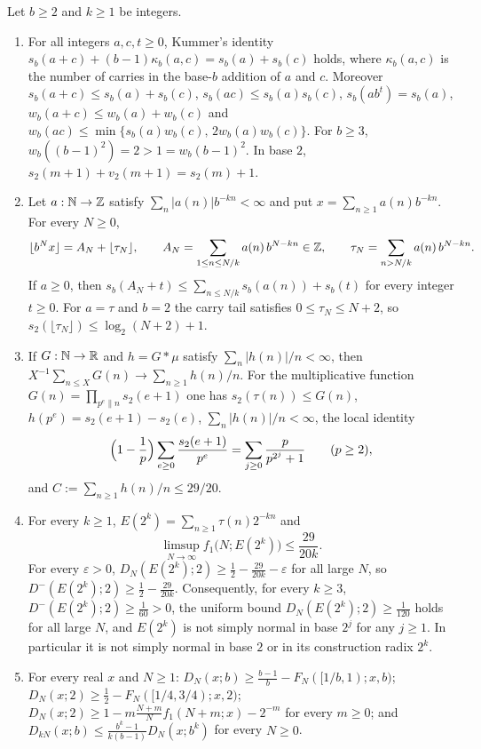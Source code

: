 \documentclass[11pt]{article}
\begin{document}
\begin{maintheorem}\label{thm:A}
Let $b\ge2$ and $k\ge1$ be integers.
\begin{enumerate}[label=\textup{(\roman*)},nosep]
\item {} For all integers $a,c,t\ge0$, Kummer's identity $s_b(a+c)+(b-1)\kappa_b(a,c)=s_b(a)+s_b(c)$ holds, where $\kappa_b(a,c)$ is the number of carries in the base-$b$ addition of $a$ and $c$. Moreover $s_b(a+c)\le s_b(a)+s_b(c)$, $s_b(ac)\le s_b(a)s_b(c)$, $s_b(ab^t)=s_b(a)$, $w_b(a+c)\le w_b(a)+w_b(c)$ and $w_b(ac)\le\min\{s_b(a)w_b(c),\,2w_b(a)w_b(c)\}$. For $b\ge3$, $w_b((b-1)^2)=2>1=w_b(b-1)^2$. In base $2$, $s_2(m+1)+v_2(m+1)=s_2(m)+1$.
\item {} Let $a:\mathbb N\to\mathbb Z$ satisfy $\sum_n|a(n)|b^{-kn}<\infty$ and put $x=\sum_{n\ge1}a(n)b^{-kn}$. For every $N\ge0$,
\[
\lfloor b^Nx\rfloor=A_N+\lfloor\tau_N\rfloor,\qquad A_N=\sum_{1\le n\le N/k}a(n)\,b^{N-kn}\in\mathbb Z,\qquad \tau_N=\sum_{n>N/k}a(n)\,b^{N-kn}.
\]
If $a\ge0$, then $s_b(A_N+t)\le\sum_{n\le N/k}s_b(a(n))+s_b(t)$ for every integer $t\ge0$. For $a=\tau$ and $b=2$ the carry tail satisfies $0\le\tau_N\le N+2$, so $s_2(\lfloor\tau_N\rfloor)\le\log_2(N+2)+1$.
\item {} If $G:\mathbb N\to\mathbb R$ and $h=G*\mu$ satisfy $\sum_n|h(n)|/n<\infty$, then $X^{-1}\sum_{n\le X}G(n)\to\sum_{n\ge1}h(n)/n$. For the multiplicative function $G(n)=\prod_{p^e\parallel n}s_2(e+1)$ one has $s_2(\tau(n))\le G(n)$, $h(p^e)=s_2(e+1)-s_2(e)$, $\sum_n|h(n)|/n<\infty$, the local identity
\[
\Bigl(1-\frac1p\Bigr)\sum_{e\ge0}\frac{s_2(e+1)}{p^e}=\sum_{j\ge0}\frac{p}{p^{2^j}+1}\qquad(p\ge2),
\]
and $C:=\sum_{n\ge1}h(n)/n\le 29/20$.
\item {} For every $k\ge1$, $E(2^k)=\sum_{n\ge1}\tau(n)2^{-kn}$ and
\[
\limsup_{N\to\infty}f_1\bigl(N;E(2^k)\bigr)\le\frac{29}{20k}.
\]
For every $\varepsilon>0$, $D_N(E(2^k);2)\ge\frac12-\frac{29}{20k}-\varepsilon$ for all large $N$, so $D^-(E(2^k);2)\ge\frac12-\frac{29}{20k}$. Consequently, for every $k\ge3$, $D^-(E(2^k);2)\ge\frac1{60}>0$, the uniform bound $D_N(E(2^k);2)\ge\frac1{120}$ holds for all large $N$, and $E(2^k)$ is not simply normal in base $2^j$ for any $j\ge1$. In particular it is not simply normal in base $2$ or in its construction radix $2^k$.
\item {} For every real $x$ and $N\ge1$: $D_N(x;b)\ge\frac{b-1}b-F_N([1/b,1);x,b)$; $D_N(x;2)\ge\frac12-F_N([1/4,3/4);x,2)$; $D_N(x;2)\ge1-m\frac{N+m}{N}f_1(N+m;x)-2^{-m}$ for every $m\ge0$; and $D_{kN}(x;b)\le\frac{b^k-1}{k(b-1)}D_N(x;b^k)$ for every $N\ge0$.
\end{enumerate}
\end{maintheorem}
\end{document}
